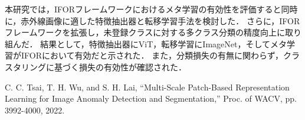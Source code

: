 \documentclass[uplatex,dvipdfmx,10pt,twocolumn]{jsarticle}
\begin{document}
本研究では，IFORフレームワークにおけるメタ学習の有効性を評価すると同時に，赤外線画像に適した特徴抽出器と転移学習手法を検討した．
さらに，IFOR フレームワークを拡張し，未登録クラスに対する多クラス分類の精度向上に取り組んだ．
結果として，特徴抽出器にViT，転移学習にImageNet，そしてメタ学習がIFORにおいて有効だと示された．
また，分類損失の有無に関わらず，クラスタリングに基づく損失の有効性が確認された．

\begin{thebibliography}{9}
C. C. Tsai, T. H. Wu, and S. H. Lai, 
``Multi-Scale Patch-Based Representation Learning for Image Anomaly Detection and Segmentation,'' 
Proc. of WACV, pp. 3992-4000, 2022.
\end{thebibliography}
\end{document}
